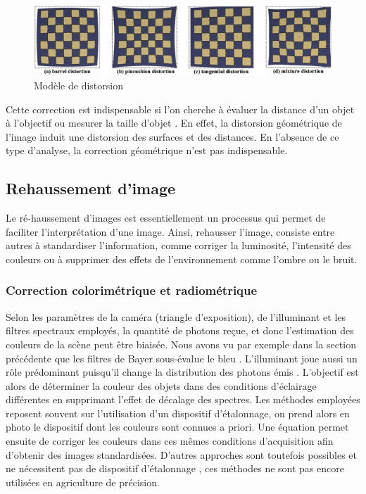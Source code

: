 \documentclass[../thesis.tex]{subfiles}
\begin{document}
    \begin{figure}[H]
        \centering
        \includegraphics[width=\linewidth]{img/biblio/distorsion-models}
        \caption{Modèle de distorsion}
        \label{fig:03-distorsion-models}
    \end{figure}
    
    \par Cette correction est indispensable si l'on cherche à évaluer la distance d'un objet à l'objectif ou mesurer la taille d'objet \cite{vayssade2018spatial}. En effet, la distorsion géométrique de l'image induit une distorsion des surfaces et des distances. En l'absence de ce type d'analyse, la correction géométrique n'est pas indispensable.
    
    \newpage
    \subsection{Rehaussement d'image}
    \label{sec:correction-color}
    
    \par Le ré-haussement d'images est essentiellement un processus qui permet de faciliter l'interprétation d'une image. Ainsi, rehausser l'image, consiste entre autres à standardiser l'information, comme corriger la luminosité, l'intensité des couleurs ou à supprimer des effets de l'environnement comme l'ombre ou le bruit. %
    
    \subsubsection{Correction colorimétrique et radiométrique}
    
    Selon les paramètres de la caméra (triangle d'exposition), de l'illuminant et les filtres spectraux employés, la quantité de photons reçue, et donc l'estimation des couleurs de la scène peut être biaisée. Nous avons vu par exemple dans la section précédente que les filtres de Bayer sous-évalue le bleu \cite{1561853}. L'illuminant joue aussi un rôle prédominant puisqu'il change la distribution des photons émis \cite{brainard1992asymmetric}. L'objectif est alors de déterminer la couleur des objets dans des conditions d'éclairage différentes en supprimant l'effet de décalage des spectres. Les méthodes employées reposent souvent sur l'utilisation d'un dispositif d'étalonnage, on prend alors en photo le dispositif dont les couleurs sont connues a priori. Une équation permet ensuite de corriger les couleurs dans ces mêmes conditions d'acquisition afin d'obtenir des images standardisées. D'autres approches sont toutefois possibles et ne nécessitent pas de dispositif d'étalonnage \cite{color-correction, DBLP:journals/corr/abs-1802-00153}, ces méthodes ne sont pas encore utilisées en agriculture de précision.
    
\end{document}
